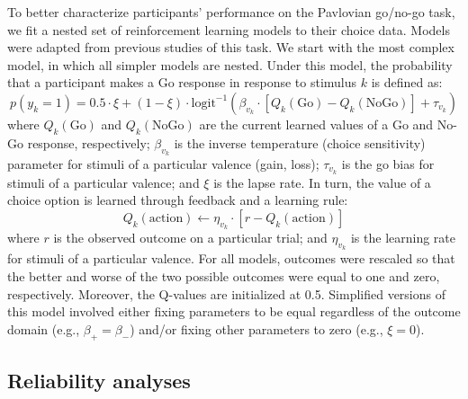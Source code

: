 \documentclass[a4paper,12pt]{article}
\begin{document}
\begin{refsection}[supp]
To better characterize participants' performance on the Pavlovian go/no-go task, we fit a nested set of reinforcement learning models to their choice data. Models were adapted from previous studies of this task. We start with the most complex model, in which all simpler models are nested. Under this model, the probability that a participant makes a Go response in response to stimulus $k$ is defined as:
\begin{equation}
    p(y_{k} = 1) = 0.5 \cdot \xi + (1 - \xi) \cdot \text{logit}^{-1} \left( \beta_{v_k} \cdot [Q_k(\text{Go}) - Q_k(\text{NoGo})] + \tau_{v_k} \right)
\end{equation}
where $Q_k(\text{Go})$ and $Q_k(\text{NoGo})$ are the current learned values of a Go and No-Go response, respectively; $\beta_{v_k}$  is the inverse temperature (choice sensitivity) parameter for stimuli of a particular valence (gain, loss); $\tau_{v_k}$ is the go bias for stimuli of a particular valence; and $\xi$ is the lapse rate. In turn, the value of a choice option is learned through feedback and a learning rule:
\begin{equation}
    Q_k(\text{action}) \leftarrow \eta_{v_k} \cdot \left[ r - Q_k(\text{action}) \right]
\end{equation}
where $r$ is the observed outcome on a particular trial; and $\eta_{v_k}$ is the learning rate for stimuli of a particular valence. For all models, outcomes were rescaled so that the better and worse of the two possible outcomes were equal to one and zero, respectively. Moreover, the Q-values are initialized at 0.5. Simplified versions of this model involved either fixing parameters to be equal regardless of the outcome domain (e.g., $\beta_{+} = \beta_-$) and/or fixing other parameters to zero (e.g., $\xi = 0$). 

\subsection*{Reliability analyses}


\end{refsection}
\end{document}
